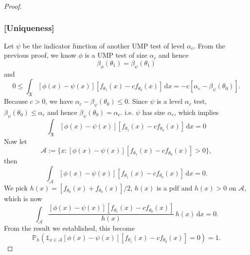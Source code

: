 \begin{proof}
    \subsubsection*{[Uniqueness]}
    Let $\psi$ be the indicator function of another UMP test of level $\alpha_c$. 
    From the previous proof, we know $\phi$ is a UMP test of size $\alpha_c$ and hence 
    \[
        \beta_{\phi}(\theta_1) = \beta_{\psi}(\theta_1) 
    \]
    and 
    \[
        0 \leq \int_{\mathfrak{X}} [\phi(x) - \psi(x)][f_{\theta_1}(x) - cf_{\theta_0}(x)] \, \mathrm{d}x
        = -c[\alpha_c - \beta_\psi(\theta_0)].
    \]
    Because $c > 0$, we have $\alpha_c - \beta_\psi(\theta_0) \leq 0$.
    Since $\psi$ is a level $\alpha_c$ test, $\beta_\psi(\theta_0) \leq \alpha_c$ and hence 
    $\beta_\psi(\theta_0) = \alpha_c$. i.e. $\psi$ has size $\alpha_c$, which implies
    \[
        \int_{\mathfrak{X}} [\phi(x) - \psi(x)][f_{\theta_1}(x) - cf_{\theta_0}(x)] \, \mathrm{d}x = 0
    \]
    Now let
    \[
        \mathcal{A} := \{ x :[\phi(x) - \psi(x)][f_{\theta_1}(x) - cf_{\theta_0}(x)] > 0 \},
    \]
    then 
    \[
        \int_{\mathcal{A}} [\phi(x) - \psi(x)][f_{\theta_1}(x) - cf_{\theta_0}(x)] \, \mathrm{d}x = 0.
    \]
    We pick $h(x) = [f_{\theta_0}(x) + f_{\theta_0}(x)] / 2$, $h(x)$ is a pdf 
    and $h(x) > 0$ on $\mathcal{A}$, which is now
    \[
        \int_{\mathcal{A}} \frac{[\phi(x) - \psi(x)][f_{\theta_1}(x) - cf_{\theta_0}(x)]}{h(x)}\,h(x) \, \mathrm{d}x = 0.
    \]
    From the result we established, this become
    \[
        \mathbb{P}_h \left( \mathbb{1}_{x \in \mathcal{A}} [\phi(x) - \psi(x)][f_{\theta_1}(x) - cf_{\theta_0}(x)] = 0 \right) = 1.
    \]
\end{proof}

